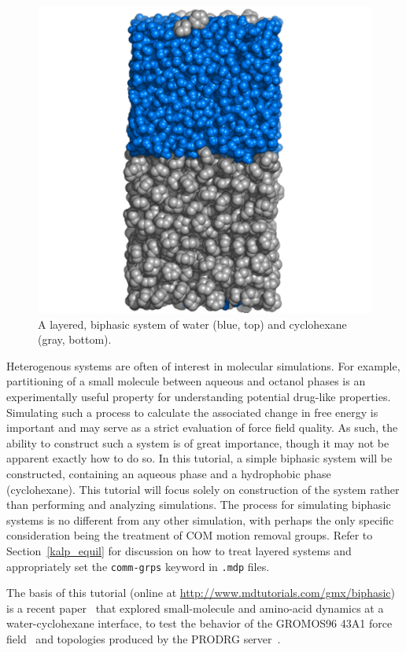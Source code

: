 \documentclass[9pt,tutorial]{livecoms}
\newcommand{\urlstring}{http://www.mdtutorials.com/gmx}
\newcommand{\tutorialbiphasic}{\url{\urlstring/biphasic}}
\begin{document}
\begin{figure}[H]
\centering
\includegraphics{biphasic_system}
\caption{A layered, biphasic system of water (blue, top) and cyclohexane (gray, bottom).}
\label{biphasic_system_fig}
\end{figure}

Heterogenous systems are often of interest in molecular simulations. For example, partitioning of a small molecule between aqueous and octanol phases is an experimentally useful property for understanding potential drug-like properties. Simulating such a process to calculate the associated change in free energy is important and may serve as a strict evaluation of force field quality. As such, the ability to construct such a system is of great importance, though it may not be apparent exactly how to do so. In this tutorial, a simple biphasic system will be constructed, containing an aqueous phase and a hydrophobic phase (cyclohexane). This tutorial will focus solely on construction of the system rather than performing and analyzing simulations. The process for simulating biphasic systems is no different from any other simulation, with perhaps the only specific consideration being the treatment of COM motion removal groups. Refer to Section~\ref{kalp_equil} for discussion on how to treat layered systems and appropriately set the \texttt{comm-grps} keyword in \texttt{.mdp} files.

The basis of this tutorial (online at \tutorialbiphasic) is a recent paper~\cite{Lemkul2010b} that explored small-molecule and amino-acid dynamics at a water-cyclohexane interface, to test the behavior of the GROMOS96 43A1 force field~\cite{Daura1998,Schuler2001} and topologies produced by the PRODRG server~\cite{vanAalten1996}.
\end{document}
